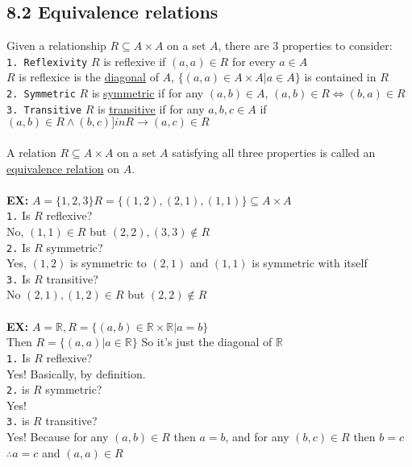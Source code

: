 \documentclass{article}
\begin{document}
		\subsection*{8.2 Equivalence relations}
		Given a relationship $R\subseteq A\times A$ on a set $A$, there are 3 properties to consider:\\
		\texttt{1. Reflexivity} $R$ is reflexive if $(a,a)\in R$ for every $a\in A$\\
		$R$ is reflexice is the \underline{diagonal} of $A$, $\{(a,a)\in A\times A | a\in A\}$ is contained in $R$\\
		\texttt{2. Symmetric} $R$ is \underline{symmetric} if for any $(a,b)\in A$, $(a,b)\in R\iff (b,a)\in R$\\
		\texttt{3. Transitive} $R$ is \underline{transitive} if for any $a,b,c\in A$ if $(a,b)\in R\land (b,c)]in R\rightarrow (a,c)\in R$\\
		\\
		A relation $R\subseteq A\times A$ on a set $A$ satisfying all three properties is called an \underline{equivalence relation} on $A$.\\ \\
		\textbf{EX:} $A=\{1,2,3\} R =\{(1,2),(2,1),(1,1)\}\subseteq A\times A$\\
		\texttt{1.} Is $R$ reflexive?\\
		No, $(1,1)\in R$ but $(2,2),(3,3)\notin R$\\
		\texttt{2.} Is $R$ symmetric?\\
		Yes, $(1,2)$ is symmetric to $(2,1)$ and $(1,1)$ is symmetric with itself\\
		\texttt{3.} Is $R$ transitive?\\
		No $(2,1),(1,2)\in R$ but $(2,2)\notin R$ \\ \\
		\textbf{EX:} $A = \mathbb{R}, R=\{(a,b)\in\mathbb{R}\times\mathbb{R} | a=b\}$\\
		Then $R=\{(a,a)|a\in\mathbb{R}\}$ So it's just the diagonal of $\mathbb{R}$\\
		\texttt{1.} Is $R$ reflexive?\\
		Yes! Basically, by definition.\\
		\texttt{2.} is $R$ symmetric?\\
		Yes!\\
		\texttt{3.} is $R$ transitive?\\
		Yes! Because for any $(a,b)\in R$ then $a = b$, and for any $(b,c)\in R$ then $b=c$ $\therefore a=c$ and $(a,a)\in R$\\
\end{document}
